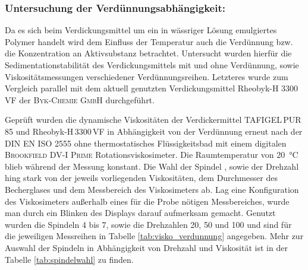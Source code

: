 \subsubsection{Untersuchung der Verdünnungsabhängigkeit:} Da es sich beim Verdickungsmittel um ein in wässriger Lösung emulgiertes Polymer handelt wird dem Einfluss der Temperatur auch die Verdünnung bzw. die Konzentration an Aktivsubstanz betrachtet. 
Untersucht wurden hierfür die Sedimentationstabilität des Verdickungsmittels mit und ohne Verdünnung, sowie Viskositätsmessungen verschiedener Verdünnungsreihen. Letzteres wurde zum Vergleich parallel mit dem aktuell genutzten Verdickungsmittel Rheobyk-H 3300 VF der \textsc{Byk-Chemie GmbH} durchgeführt.

Geprüft wurden die dynamische Viskositäten der Verdickermittel TAFIGEL\,PUR\,85 und Rheobyk-H\,3300\,VF in Abhängigkeit von der Verdünnung erneut nach der DIN EN ISO 2555 ohne thermostatisches Flüssigkeitsbad mit einem digitalen \textsc{Brookfield DV-I Prime} Rotationsviskosimeter. Die Raumtemperatur von \SI{20}{\celsius} blieb während der Messung konstant. Die Wahl der Spindel , sowie der Drehzahl hing stark von der jeweils vorliegenden Viskositäten, dem Durchmesser des Becherglases und dem Messbereich des Viskosimeters ab. Lag eine Konfiguration des Viskosimeters außerhalb eines für die Probe nötigen Messbereiches, wurde man durch ein Blinken des Displays darauf aufmerksam gemacht. Genutzt wurden die Spindeln 4 bis 7, sowie die Drehzahlen 20, 50 und \SI{100}{\rpm} und sind für die jeweiligen Messreihen in Tabelle \ref{tab:visko_verdunnung} angegeben. Mehr zur Auswahl der Spindeln in Abhängigkeit von Drehzahl und Viskosität ist in der Tabelle \ref{tab:spindelwahl} zu finden.

\begin{table}[h!]
	\renewcommand*{\arraystretch}{1.2}
	\centering
	\caption{Viskositätsbereiche der verschiedenen Spindeln in Abhängigkeit von der Drehzahl, erstellt nach \cite{SteffiReinhardt.2016}}
	\label{tab:spindelwahl}
\end{table}%
\FloatBarrier

